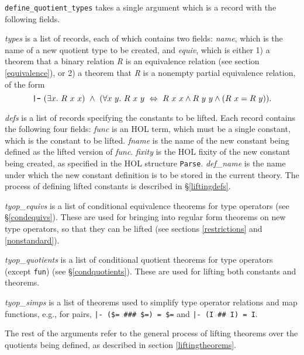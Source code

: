 \documentclass[envcountsame,runningheads]{llncs}
\begin{document}
{\tt define\_quotient\_types} takes a single argument which is a
record with the following fields.

{\it types\/} is a list of records, each of which contains two fields:
{\it name}, which is the name of a new quotient type to be created, and 
{\it equiv}, which is
either 1)
a theorem that a binary relation {\it R\/}
is an equivalence relation
(see section \ref{equivalence}),
or 2)
a theorem that {\it R\/} is a nonempty partial equivalence relation,
of the form
$$
\mbox{\tt |-}\ 
(\exists x.\ R\ x\ x) \ \wedge \ 
(\forall x\ y.\ R\ x\ y \ \Leftrightarrow \ 
                R\ x\ x \wedge R\ y\ y \wedge (R\ x = R\ y)).
$$
%

{\it defs\/} is a list of records specifying the constants to be lifted.
Each record contains the following four fields:
{\it func\/} is an HOL term, which must be a single constant, which is the 
constant to be lifted.
{\it fname\/} is the name of the new constant being defined as the lifted version of {\it func}.
{\it fixity\/} is the HOL fixity of the new constant being created,
as specified in the HOL structure {\tt Parse}.
{\it def\_name} is the name under which the new constant definition is to 
be stored in the current theory.
The
process of defining lifted constants
is described in
\S\ref{liftingdefs}.

{\it tyop\_equivs\/} is a list of conditional equivalence theorems
for type operators
(see
\S\ref{condequivs}).  These are used for
bringing into regular form
theorems on new type operators, so that they can be lifted
(see sections \ref{restrictions} and
\ref{nonstandard}).

{\it tyop\_quotients\/} is a list of conditional quotient theorems
for type operators
(except {\tt fun})
(see
\S\ref{condquotients}).  These are used for lifting both constants
and theorems.

{\it tyop\_simps\/} is a list of theorems used to simplify type operator
relations and map functions, e.g.,
for pairs,
{\tt |- (\$= \#\#\# \$=) = \$=} and
{\tt |- (I \#\# I) = I}.

The rest of the arguments refer to the general process of lifting theorems
over the quotients being defined,
as described in section \ref{liftingtheorems}.
\end{document}

